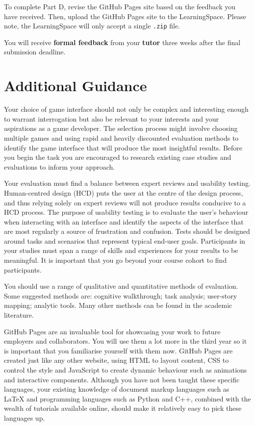 \documentclass{../fal_assignment}
\begin{document}
To complete Part D, revise the GitHub Pages site based on the feedback you have received. Then, upload the GitHub Pages site to the LearningSpace. Please note, the LearningSpace will only accept a single \texttt{.zip} file.

You will receive \textbf{formal feedback} from your \textbf{tutor} three weeks after the final submission deadline.

\section*{Additional Guidance}

Your choice of game interface should not only be complex and interesting enough to warrant interrogation but also be relevant to your interests and your aspirations as a game developer. The selection process might involve choosing multiple games and using rapid and heavily discounted evaluation methods to identify the game interface that will produce the most insightful results. Before you begin the task you are encouraged to research existing case studies and evaluations to inform your approach. 

Your evaluation must find a balance between expert reviews and usability testing. Human-centred design (HCD) puts the user at the centre of the design process, and thus relying solely on expert reviews will not produce results conducive to a HCD process. The purpose of usability testing is to evaluate the user's behaviour when interacting with an interface and identify the aspects of the interface that are most regularly a source of frustration and confusion. Tests should be designed around tasks and scenarios that represent typical end-user goals. Participants in your studies must span a range of skills and experiences for your results to be meaningful. It is important that you go beyond your course cohort to find participants. 

You should use a range of qualitative and quantitative methods of evaluation. Some suggested methods are: cognitive walkthrough; task analysis; user-story mapping; analytic tools. Many other methods can be found in the academic literature.

GitHub Pages are an invaluable tool for showcasing your work to future employers and collaborators. You will use them a lot more in the third year so it is important that you familiarise yourself with them now. GitHub Pages are created just like any other website, using HTML to layout content, CSS to control the style and JavaScript to create dynamic behaviour such as animations and interactive components. Although you have not been taught these specific languages, your existing knowledge of document markup languages such as LaTeX and programming languages such as Python and C++, combined with the wealth of tutorials available online, should make it relatively easy to pick these languages up.
\end{document}
